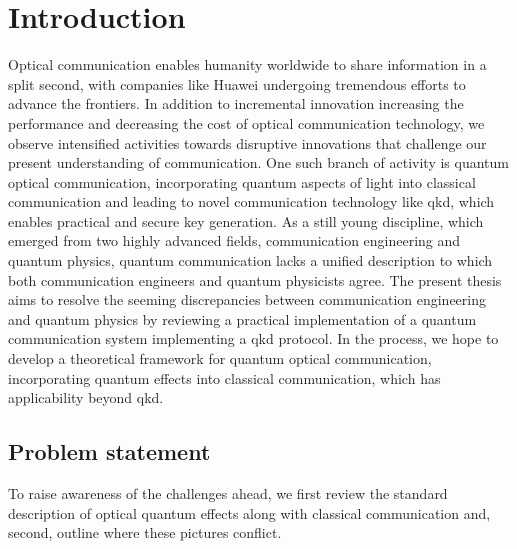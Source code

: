 \chapter*{Introduction}

Optical communication enables humanity worldwide to share information in a split second, with companies like Huawei undergoing tremendous efforts to advance the frontiers.
In addition to incremental innovation increasing the performance and decreasing the cost of optical communication technology, we observe intensified activities towards disruptive innovations that challenge our present understanding of communication.
One such branch of activity is quantum optical communication, incorporating quantum aspects of light into classical communication and leading to novel communication technology like \gls{qkd}, which enables practical and secure key generation.
As a still young discipline, which emerged from two highly advanced fields, communication engineering and quantum physics, quantum communication lacks a unified description to which both communication engineers and quantum physicists agree.
The present thesis aims to resolve the seeming discrepancies between communication engineering and quantum physics by reviewing a practical implementation of a quantum communication system implementing a \gls{qkd} protocol.
In the process, we hope to develop a theoretical framework for quantum optical communication, incorporating quantum effects into classical communication, which has applicability beyond \gls{qkd}.

\section*{Problem statement}

To raise awareness of the challenges ahead, we first review the standard description of optical quantum effects along with classical communication and, second, outline where these pictures conflict.

